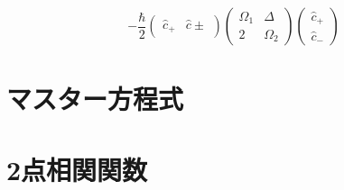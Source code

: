 \begin{equation}
    -\frac{\hbar}{2}\left(\begin{array}{cc}
    \hat{c}_{+} & \hat{c} \pm
    \end{array}\right)\left(\begin{array}{cc}
    \Omega_{1} & \Delta \\
    2 & \Omega_{2}
    \end{array}\right)\left(\begin{array}{l}
    \hat{c}_{+} \\
    \hat{c}_{-}
    \end{array}\right)
\end{equation}

\section{マスター方程式}
\section{2点相関関数}
